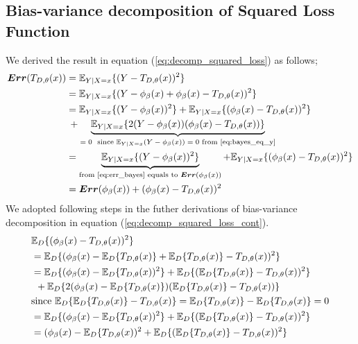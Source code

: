 \subsection{Bias-variance decomposition of Squared Loss Function}
\label{app:bias_var_decomp}
We derived the result in equation (\ref{eq:decomp_squared_loss}) as follows;
\begin{align}
\boldsymbol{Err}(T_{D, \theta}(x)) & = \mathbb{E}_{Y|X=x}\{(Y-T_{D,\theta}(x))^2\} \notag \\
							  & = \mathbb{E}_{Y|X=x}\{(Y -\phi_{\beta}(x) +\phi_{\beta}(x) -T_{D,\theta}(x))^2\} \notag \\
							  & = \mathbb{E}_{Y|X=x}\{(Y-\phi_{\beta}(x))^2\} + \mathbb{E}_{Y|X=x}\{(\phi_{\beta}(x)-T_{D,\theta}(x))^2\} \notag \\
							  &	\: + \underbrace{\mathbb{E}_{Y|X=x}\{2(Y-\phi_{\beta}(x))(\phi_{\beta}(x)-T_{D,\theta}(x))\}}_\text{$=0$ \ since $ \mathbb{E}_{Y|X=x}(Y-\phi_{\beta}(x)) = 0$ from \ref{eq:bayes_eq_y}}  \notag \\
							  & = \underbrace{\mathbb{E}_{Y|X=x}\{(Y-\phi_{\beta}(x))^2\}}_\text{from \ref{eq:err_bayes} equals to $\boldsymbol{Err}(\phi_{\beta}(x))$} + \mathbb{E}_{Y|X=x}\{(\phi_{\beta}(x)-T_{D,\theta}(x))^2\}  \notag \\
							  & = \boldsymbol{Err}(\phi_{\beta}(x)) + (\phi_{\beta}(x)-T_{D,\theta}(x))^2\notag
\end{align}
We adopted following steps in the futher derivations of bias-variance decomposition in equation (\ref{eq:decomp_squared_loss_cont}).
\begin{align}
& \mathbb{E}_{D}\{(\phi_{\beta}(x) - T_{D,\theta}(x))^2 \} \notag \\
& = \mathbb{E}_{D}\{(\phi_{\beta}(x) - \mathbb{E}_{D}\{T_{D,\theta}(x)\} + \mathbb{E}_{D}\{T_{D,\theta}(x)\} - T_{D,\theta}(x))^2\} \notag \\
& = \mathbb{E}_{D}\{(\phi_{\beta}(x) - \mathbb{E}_{D}\{T_{D,\theta}(x))^2\} 
	+ \mathbb{E}_{D}\{(\mathbb{E}_{D}\{T_{D,\theta}(x)\} - T_{D,\theta}(x))^2\} \notag \\
&\: \: + \mathbb{E}_{D}\{2(\phi_{\beta}(x) - \mathbb{E}_{D}\{T_{D,\theta}(x)\})(\mathbb{E}_{D}\{T_{D,\theta}(x)\} - T_{D,\theta}(x))\} \notag \\
& \text{since $\mathbb{E}_{D}\{\mathbb{E}_{D}\{T_{D,\theta}(x)\} - T_{D,\theta}(x)\} = \mathbb{E}_{D}\{T_{D,\theta}(x)\} - \mathbb{E}_{D}\{T_{D,\theta}(x)\} = 0$} \notag \\
& = \mathbb{E}_{D}\{(\phi_{\beta}(x) - \mathbb{E}_{D}\{T_{D,\theta}(x))^2\} 
	+ \mathbb{E}_{D}\{(\mathbb{E}_{D}\{T_{D,\theta}(x)\} - T_{D,\theta}(x))^2\} \notag \\
& = (\phi_{\beta}(x) - \mathbb{E}_{D}\{T_{D,\theta}(x))^2 + \mathbb{E}_{D}\{(\mathbb{E}_{D}\{T_{D,\theta}(x)\} - T_{D,\theta}(x))^2\}\notag
\end{align}

